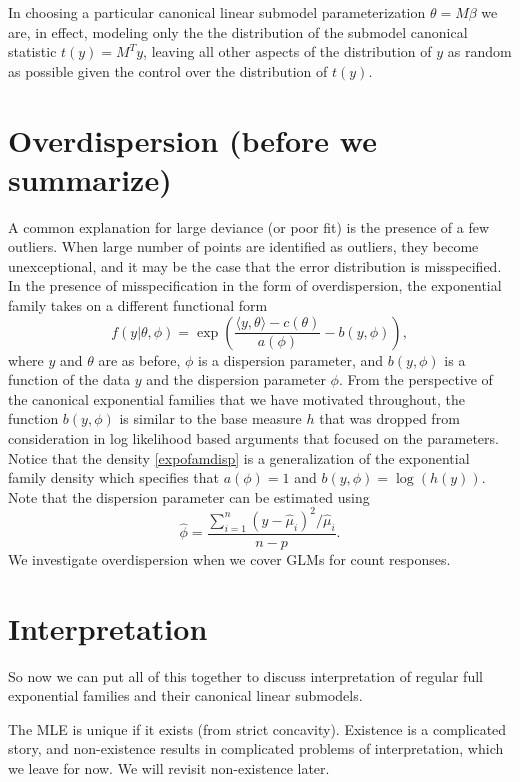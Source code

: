 \documentclass[12pt]{article}
\newcommand{\inner}[1]{\langle #1 \rangle}
\begin{document}
In choosing a particular canonical linear submodel parameterization $\theta = M\beta$ we are, in effect, modeling only the the distribution of the submodel canonical statistic $t(y) = M^T y$, leaving all other aspects of the distribution of $y$ as random as possible given the control over the distribution of $t(y)$.


\section*{Overdispersion (before we summarize)}

A common explanation for large deviance (or poor fit) is the presence of a few outliers. When large number of points are identified as outliers, they become unexceptional, and it may be the case that the error distribution is misspecified. In the presence of misspecification in the form of overdispersion, the exponential family takes on a different functional form
\begin{equation} \label{expofamdisp}
  f(y|\theta,\phi) = \exp\left(\frac{\inner{y,\theta}- c(\theta)}{a(\phi)} - b(y,\phi) \right),
\end{equation}
where $y$ and $\theta$ are as before, $\phi$ is a dispersion parameter, and $b(y,\phi)$ is a function of the data $y$ and the dispersion parameter $\phi$. From the perspective of the canonical exponential families that we have motivated throughout, the function $b(y,\phi)$ is similar to the base measure $h$ that was dropped from consideration in log likelihood based arguments that focused on the parameters. Notice that the density \eqref{expofamdisp} is a generalization of the exponential family density which specifies that $a(\phi) = 1$ and $b(y,\phi) = \log(h(y))$. Note that the dispersion parameter can be estimated using
$$
  \hat{\phi} = \frac{\sum_{i=1}^n(y - \hat\mu_i)^2/\hat\mu_i}{n-p}.
$$
We investigate overdispersion when we cover GLMs for count responses.


\section*{Interpretation}

So now we can put all of this together to discuss interpretation of regular full exponential families and their canonical linear submodels.

The MLE is unique if it exists (from strict concavity). Existence is a complicated story, and non-existence results in complicated problems of interpretation, which we leave for now. We will revisit non-existence later.
\end{document}
